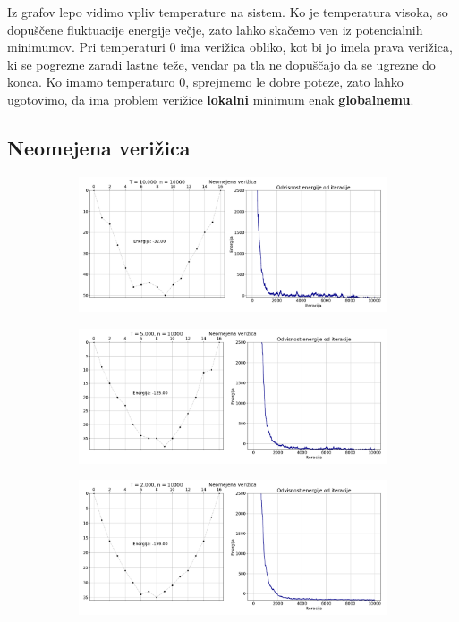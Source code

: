 \documentclass[11pt, a4paper]{article}
\begin{document}
Iz grafov lepo vidimo vpliv temperature na sistem. Ko je temperatura visoka, so dopuščene fluktuacije energije večje, zato lahko skačemo ven iz potencialnih minimumov. Pri temperaturi 0 ima verižica obliko, kot bi jo imela prava verižica, ki se pogrezne zaradi lastne teže, vendar pa tla ne dopuščajo da se ugrezne do konca. Ko imamo temperaturo 0, sprejmemo le dobre poteze, zato lahko ugotovimo, da ima problem verižice \textbf{lokalni} minimum enak \textbf{globalnemu}.
\subsection{Neomejena verižica}  
\begin{figure}[H]
\centering

  \includegraphics[width=16cm, height=4cm]{neomejena_globina_T0_10.png}
 
\end{figure} 
\begin{figure}[H]
\centering

  \includegraphics[width=16cm, height=4cm]{neomejena_globina_T0_5.png}
 
\end{figure} 
\begin{figure}[H]
\centering

  \includegraphics[width=16cm, height=4cm]{neomejena_globina_T0_2.png}
 
\end{figure} 
\end{document}
